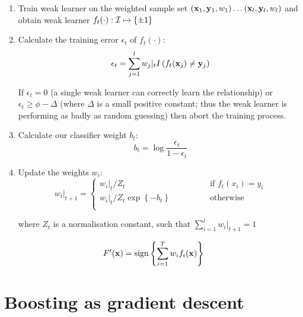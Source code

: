 \begin{enumerate}

\item	Train weak learner on the weighted sample set 
	$(\mathbf{x}_1, \mathbf{y}_1, w_1) \ldots (\mathbf{x}_l, \mathbf{y}_l, w_l)$
	and obtain weak learner $f_t(\cdot) : \mathcal{I} \mapsto \{\pm 1\}$

\item	Calculate the training error $\epsilon_t$ of $f_t(\cdot)$:
	\begin{equation}
	\epsilon_t = \sum_{j=1}^l w_j |_t 
	I \left( f_t(\mathbf{x}_j) \neq \mathbf{y}_j\right)
	\end{equation}

	If $\epsilon_t = 0$ (a single weak learner can correctly learn
	the relationship) or $\epsilon_t \geq \phi - \Delta$ (where
	$\Delta$ is a small positive constant; thus the weak
	learner is performing as badly as random guessing) then abort
	the training process.

\item	Calculate our classifier weight $b_t$:
	\begin{equation}
	b_t = \log \frac{\epsilon_t}{1 - \epsilon_t}
	\end{equation}

\item	Update the weights $w_i$:
	\begin{equation}
	w_i|_{t+1} = \left\{
	\begin{array}{cl}
		w_i|_t / Z_t	&	\qquad \qquad \mbox{if
		$f_t(x_i) = y_i$} \\
		w_i|_t / Z_t \exp \left\{ -b_t \right\} & \qquad \qquad
		\mbox{otherwise} \\
	\end{array} \right.
	\end{equation}

	where $Z_t$ is a normalisation constant, such that
	$\sum_{i=1}^{l} w_i|_{t+1} = 1$
\end{enumerate}

\par
{} 
\begin{equation}
F'(\mathbf{x}) = \mathrm{sign} \left\{ \sum_{i=1}^T w_i f_i(\mathbf{x}) \right\}
\end{equation}


\section{Boosting as gradient descent}
\label{sec:theory:gradient descent}

